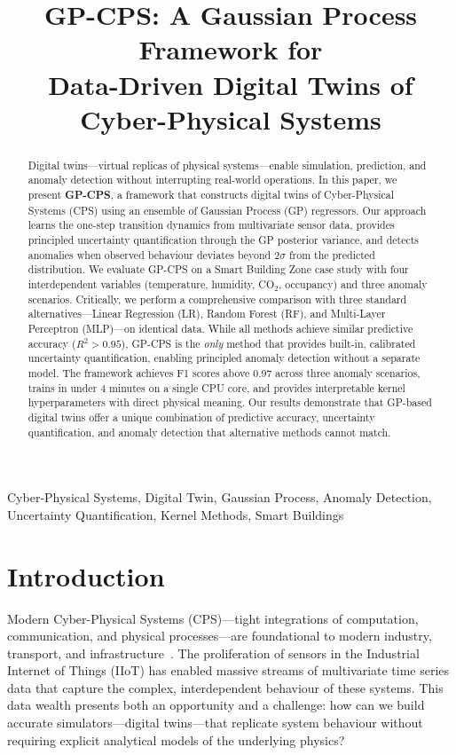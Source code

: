 \documentclass[conference]{IEEEtran}
\title{GP-CPS: A Gaussian Process Framework for\\ Data-Driven Digital Twins of\\ Cyber-Physical Systems}
\author{\IEEEauthorblockN{J. Calataiut-Cl\raisebox{0.5mm}{\noindent\rule{3mm}{0.5pt}}i\raisebox{0.5mm}{\noindent\rule{3mm}{0.5pt}}}
\IEEEauthorblockA{Department of Advanced Mathematics\\
Universidad Politécnica\\
Email: jcalataiut-cli@github.com}
}
\begin{document}
\maketitle

\begin{abstract}
Digital twins---virtual replicas of physical systems---enable simulation, prediction, and anomaly detection without interrupting real-world operations. In this paper, we present \textbf{GP-CPS}, a framework that constructs digital twins of Cyber-Physical Systems (CPS) using an ensemble of Gaussian Process (GP) regressors. Our approach learns the one-step transition dynamics from multivariate sensor data, provides principled uncertainty quantification through the GP posterior variance, and detects anomalies when observed behaviour deviates beyond $2\sigma$ from the predicted distribution. We evaluate GP-CPS on a Smart Building Zone case study with four interdependent variables (temperature, humidity, CO$_2$, occupancy) and three anomaly scenarios. Critically, we perform a comprehensive comparison with three standard alternatives---Linear Regression (LR), Random Forest (RF), and Multi-Layer Perceptron (MLP)---on identical data. While all methods achieve similar predictive accuracy ($R^2 > 0.95$), GP-CPS is the \emph{only} method that provides built-in, calibrated uncertainty quantification, enabling principled anomaly detection without a separate model. The framework achieves F1 scores above 0.97 across three anomaly scenarios, trains in under 4 minutes on a single CPU core, and provides interpretable kernel hyperparameters with direct physical meaning. Our results demonstrate that GP-based digital twins offer a unique combination of predictive accuracy, uncertainty quantification, and anomaly detection that alternative methods cannot match.
\end{abstract}

\begin{IEEEkeywords}
Cyber-Physical Systems, Digital Twin, Gaussian Process, Anomaly Detection, Uncertainty Quantification, Kernel Methods, Smart Buildings
\end{IEEEkeywords}

\section{Introduction}
\label{sec:introduction}

Modern Cyber-Physical Systems (CPS)---tight integrations of computation, communication, and physical processes---are foundational to modern industry, transport, and infrastructure~\cite{lee2015,zhang2022}. The proliferation of sensors in the Industrial Internet of Things (IIoT) has enabled massive streams of multivariate time series data that capture the complex, interdependent behaviour of these systems. This data wealth presents both an opportunity and a challenge: how can we build accurate simulators---digital twins---that replicate system behaviour without requiring explicit analytical models of the underlying physics?
\end{document}
